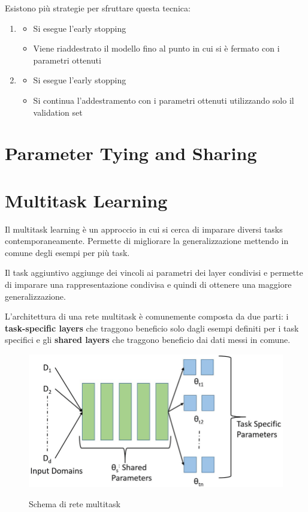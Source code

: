 Esistono più strategie per sfruttare questa tecnica:
\begin{enumerate}
  \item {
        \begin{itemize}
          \item Si esegue l'early stopping
          \item Viene riaddestrato il modello fino al punto in cui si è fermato con i parametri ottenuti
        \end{itemize}
        }
  \item {
        \begin{itemize}
          \item Si esegue l'early stopping
          \item Si continua l'addestramento con i parametri ottenuti utilizzando solo il validation set
        \end{itemize}
        }
\end{enumerate}

\section{Parameter Tying and Sharing}


\section{Multitask Learning}
Il multitask learning è un approccio in cui si cerca di imparare diversi tasks contemporaneamente.
Permette di migliorare la generalizzazione mettendo in comune degli esempi per più task.

Il task aggiuntivo aggiunge dei vincoli ai parametri dei layer condivisi e permette di imparare una rappresentazione condivisa e quindi di ottenere una maggiore generalizzazione.

L'architettura di una rete multitask è comunemente composta da due parti:
i \textbf{task-specific layers} che traggono beneficio solo dagli esempi definiti per i task specifici e
gli \textbf{shared layers} che traggono beneficio dai dati messi in comune.

\begin{figure}[h]
  \centering
  \includegraphics[width=0.8\linewidth]{images/multitask.png}
  \label{img:multitask}
  \caption{Schema di rete multitask \cite{img:multitask}}
\end{figure}


